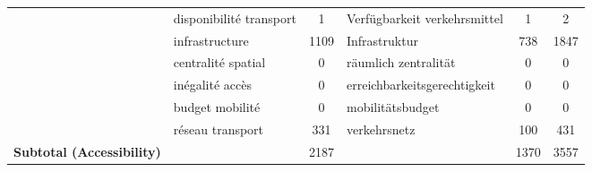 \begin{table}[H]
{\begin{tabular}{@{}llS[table-format=5.0]lS[table-format=5.0]S[table-format=5.0]@{}}
 & disponibilité transport & 1 & Verfügbarkeit verkehrsmittel & 1 & 2 \\
 & infrastructure & 1109 & Infrastruktur & 738 & 1847  \\
 & centralité spatial & 0 & räumlich zentralität & 0 & 0  \\
 & inégalité accès & 0 & erreichbarkeitsgerechtigkeit & 0 & 0  \\
 & budget mobilité & 0 & mobilitätsbudget & 0 & 0 \\
 & réseau transport & 331 & verkehrsnetz & 100 & 431  \\
\midrule
\textbf{Subtotal (Accessibility)} &  & 2187 &  & 1370 & 3557  \\
\bottomrule
\end{tabular}
}
\label{table:table_motility}
\end{table}


